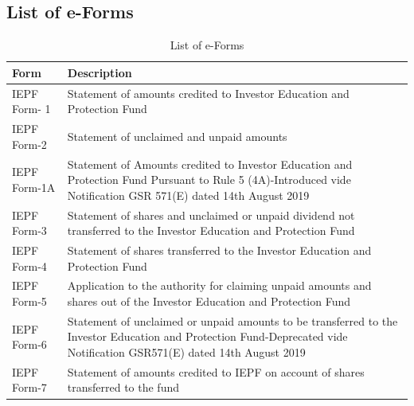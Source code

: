 \documentclass[openany]{book}
\begin{document}
\subsection{List of e-Forms }
\begin{table}[H]
\centering
\begin{tabular}{|p{3.5cm}|p{11.5cm}|}
\hline
\textbf{Form} & \textbf{Description} \\ \hline
IEPF Form- 1 & Statement of amounts credited to Investor Education and Protection Fund \\ \hline
IEPF Form-2 & Statement of unclaimed and unpaid amounts \\ \hline
IEPF Form-1A & Statement of Amounts credited to Investor Education and Protection Fund Pursuant to Rule 5 (4A)-Introduced vide Notification GSR 571(E) dated 14th August 2019 \\ \hline
IEPF Form-3 & Statement of shares and unclaimed or unpaid dividend not transferred to the Investor Education and Protection Fund \\ \hline
IEPF Form-4 & Statement of shares transferred to the Investor Education and Protection Fund \\ \hline
IEPF Form-5 & Application to the authority for claiming unpaid amounts and shares out of the Investor Education and Protection Fund \\ \hline
IEPF Form-6 & Statement of unclaimed or unpaid amounts to be transferred to the Investor Education and Protection Fund-Deprecated vide Notification GSR571(E) dated 14th August 2019 \\ \hline
IEPF Form-7 & Statement of amounts credited to IEPF on account of shares transferred to the fund \\ \hline
\end{tabular}
\caption{List of e-Forms}
\label{tab:e_forms}
\end{table}
\end{document}
